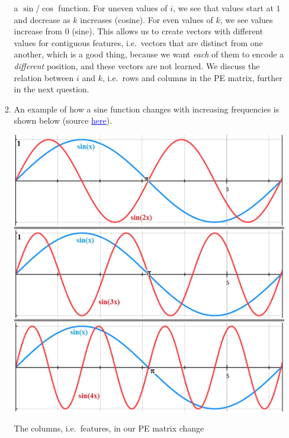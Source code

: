\documentclass[11pt,a4paper]{article}
\begin{document}
\begin{enumerate}[label=(\alph*)]
\begin{enumerate}[label=(\roman*)]
                    a $\sin$/$\cos$ function.
                    For uneven values of $i$, we see that values start at $1$
                    and decrease as $k$ increases (cosine).
                    For even values of $k$, we see values increase from $0$
                    (sine).
                    This allows us to create vectors with different values for
                    contiguous features, i.e.\ vectors that are distinct from
                    one another, which is a good thing, because we want
                    \emph{each} of them to encode a \emph{different} position,
                    and these vectors are not learned.
                    We discuss the relation between $i$ and $k$, i.e.\ rows and
                    columns in the PE matrix, further in the next question.
              \item An example of how a sine function changes with increasing
                    frequencies is shown below (source
                    \href{https://antapex.org/mathnote4new.htm}{\textcolor{blue}{\underline{here}}}).
                    \begin{center}
                        \includegraphics[scale=0.4]{img/sinuscosinus_10.jpg}
                    \end{center}
                    The columns, i.e.\ features, in our PE matrix change

\end{enumerate}
\end{enumerate}
\end{document}
